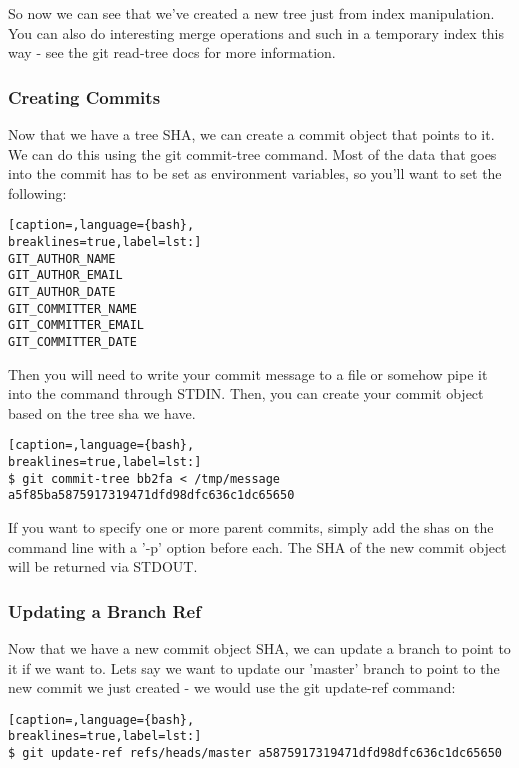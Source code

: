 So now we can see that we've created a new tree just from index manipulation.
You can also do interesting merge operations and such in a temporary index this
way - see the git read-tree docs for more information.

\subsubsection{Creating Commits}
Now that we have a tree SHA, we can create a commit object that points to it.
We can do this using the git commit-tree command. Most of the data that goes
into the commit has to be set as environment variables, so you'll want to set
the following:
\lstset{basicstyle=\scriptsize, numbers=none, captionpos=b, tabsize=4}
\begin{lstlisting}[caption=,language={bash},
breaklines=true,label=lst:]
GIT_AUTHOR_NAME
GIT_AUTHOR_EMAIL
GIT_AUTHOR_DATE
GIT_COMMITTER_NAME
GIT_COMMITTER_EMAIL
GIT_COMMITTER_DATE
\end{lstlisting}

Then you will need to write your commit message to a file or somehow pipe it
into the command through STDIN. Then, you can create your commit object based
on the tree sha we have.
\lstset{basicstyle=\scriptsize, numbers=none, captionpos=b, tabsize=4}
\begin{lstlisting}[caption=,language={bash},
breaklines=true,label=lst:]
$ git commit-tree bb2fa < /tmp/message
a5f85ba5875917319471dfd98dfc636c1dc65650
\end{lstlisting}

If you want to specify one or more parent commits, simply add the shas on the
command line with a '-p' option before each. The SHA of the new commit object
will be returned via STDOUT.

\subsubsection{Updating a Branch Ref}
Now that we have a new commit object SHA, we can update a branch to point to it
if we want to. Lets say we want to update our 'master' branch to point to the
new commit we just created - we would use the git update-ref command:
\lstset{basicstyle=\scriptsize, numbers=none, captionpos=b, tabsize=4}
\begin{lstlisting}[caption=,language={bash},
breaklines=true,label=lst:]
$ git update-ref refs/heads/master a5875917319471dfd98dfc636c1dc65650
\end{lstlisting}
